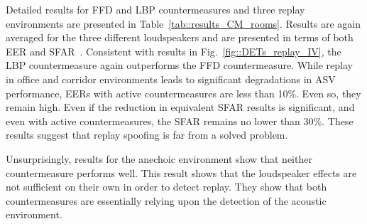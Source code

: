 Detailed results for FFD and LBP countermeasures and three replay environments are presented in Table~\ref{tab::results_CM_rooms}.  Results are again averaged for the three different loudspeakers and are presented in terms of both EER and SFAR~\cite{Johnson2010}.  
Consistent with results in Fig.~\ref{fig::DETs_replay_IV}, the LBP countermeasure again outperforms the FFD countermeasure.  While replay in office and corridor environments leads to significant degradations in ASV performance, EERs with active countermeasures are less than 10\%.  Even so, they remain high.  Even if the reduction in equivalent SFAR results is significant, and even with active countermeasures, the SFAR remains no lower than 30\%.  These results suggest that replay spoofing is far from a solved problem. 

Unsurprisingly, results for the anechoic environment show that neither countermeasure performs well.  This result shows that the loudspeaker effects are not sufficient on their own in order to detect replay.  They show that both countermeasures are essentially relying upon the detection of the acoustic environment. 




